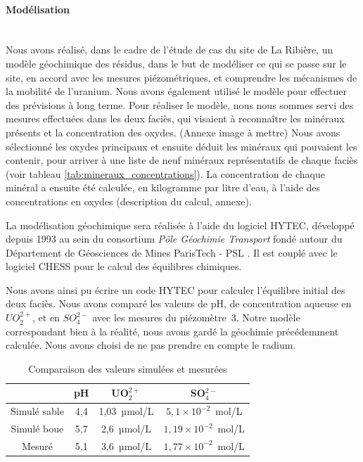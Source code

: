 \documentclass{article}
\begin{document}
\paragraph{Modélisation \\ \\}
Nous avons réalisé, dans le cadre de l’étude de cas du site de La Ribière, un modèle géochimique des résidus, dans le but de modéliser ce qui se passe sur le site, en accord avec les mesures piézométriques, et comprendre les mécanismes de la mobilité de l’uranium. Nous avons également utilisé le modèle pour effectuer des prévisions à long terme.
Pour réaliser le modèle, nous nous sommes servi des mesures effectuées dans les deux faciès, qui visaient à reconnaître les minéraux présents et la concentration des oxydes. (Annexe image à mettre) Nous avons sélectionné les oxydes principaux et ensuite déduit les minéraux qui pouvaient les contenir, pour arriver à une liste de neuf minéraux représentatifs de chaque faciès (voir tableau \ref{tab:mineraux_concentrations}). La concentration de chaque minéral a ensuite été calculée, en kilogramme par litre d’eau, à l’aide des concentrations en oxydes (description du calcul, annexe).

La modélisation géochimique sera réalisée à l'aide du logiciel HYTEC, développé depuis 1993 au sein du consortium \emph{Pôle Géochimie Transport} fondé autour du Département de Géosciences de Mines ParisTech - PSL \cite{site_hytec_hydrodynamique_nodate}. Il est couplé avec le logiciel CHESS \cite{lagneau:hal-00614306} pour le calcul des équilibres chimiques. 
	
Nous avons ainsi pu écrire un code HYTEC pour calculer l’équilibre initial des deux faciès. Nous avons comparé les valeurs de pH, de concentration aqueuse en $UO_2^{2+}$, et en $SO_4^{2-}$ avec les mesures du piézomètre~3. Notre modèle correspondant bien à la réalité, nous avons gardé la géochimie précédemment calculée. Nous avons choisi de ne pas prendre en compte le radium.
	
\begin{table}[H]
    \centering    
    \caption{Comparaison des valeurs simulées et mesurées}
    \begin{tabular}{ |c |c |c |c |}
        \hline
         \textbf{} & \textbf{pH} & \textbf{UO$_2^{2+}$} & \textbf{SO$_4^{2-}$}\\ 
         \hline
         Simulé sable & 4,4 & 1,03~µmol/L & $5,1 \times 10^{-2}$~mol/L \\ 
         \hline
         Simulé boue & 5,7 & 2,6~µmol/L & $1,19 \times 10^{-2}$~mol/L  \\
         \hline
        Mesuré & 5,1 & 3,6~µmol/L & $1,77 \times 10^{-2}$~mol/L  \\
         \hline
    \end{tabular}

    \label{tab:comparaison_valeurs_simul_mesure}
\end{table}
\end{document}
